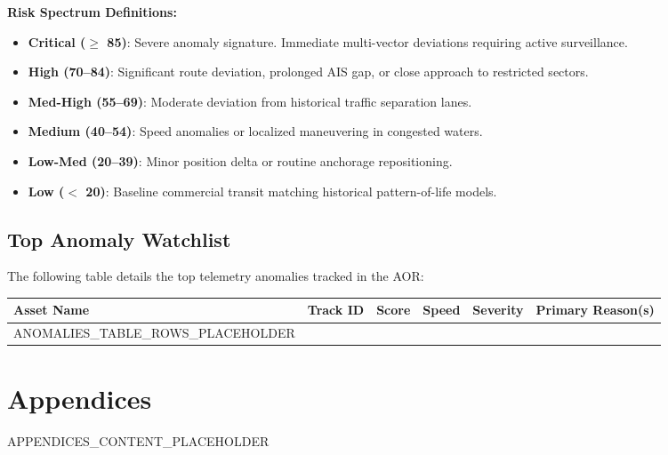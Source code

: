\documentclass[11pt,a4paper]{article}
\begin{document}
\noindent \textbf{Risk Spectrum Definitions:}
\begin{itemize}
    \item \textbf{Critical ($\ge$ 85)}: Severe anomaly signature. Immediate multi-vector deviations requiring active surveillance.
    \item \textbf{High (70--84)}: Significant route deviation, prolonged AIS gap, or close approach to restricted sectors.
    \item \textbf{Med-High (55--69)}: Moderate deviation from historical traffic separation lanes.
    \item \textbf{Medium (40--54)}: Speed anomalies or localized maneuvering in congested waters.
    \item \textbf{Low-Med (20--39)}: Minor position delta or routine anchorage repositioning.
    \item \textbf{Low ($<$ 20)}: Baseline commercial transit matching historical pattern-of-life models.
\end{itemize}
\vspace{0.4cm}

\subsection{Top Anomaly Watchlist}
The following table details the top telemetry anomalies tracked in the AOR:

\vspace{0.3cm}
\begin{center}
\begin{tabular}{llcllp{5cm}}
\toprule
\textbf{Asset Name} & \textbf{Track ID} & \textbf{Score} & \textbf{Speed} & \textbf{Severity} & \textbf{Primary Reason(s)} \\
\midrule
ANOMALIES_TABLE_ROWS_PLACEHOLDER
\bottomrule
\end{tabular}
\end{center}
\vspace{0.3cm}

\newpage

\section{Appendices}

APPENDICES_CONTENT_PLACEHOLDER
\end{document}

